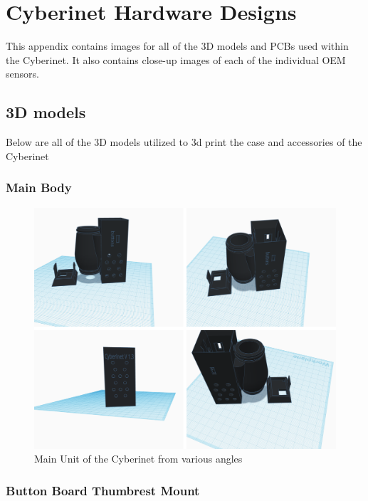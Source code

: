 \chapter{Cyberinet Hardware Designs}
This appendix contains images for all of the 3D models and PCBs used within the Cyberinet. It also contains close-up images of each of the individual OEM sensors.

\section{3D models}
Below are all of the 3D models utilized to 3d print the case and accessories of the Cyberinet

\subsection{Main Body}

\begin{figure}
    \centering
    \includegraphics[scale=0.4]{diagrams/3D Models/Cyberinet main case 3d.png}
    \caption{Main Unit of the Cyberinet from various angles}
    \label{fig:main3D}
\end{figure}



\subsection{Button Board Thumbrest Mount}

